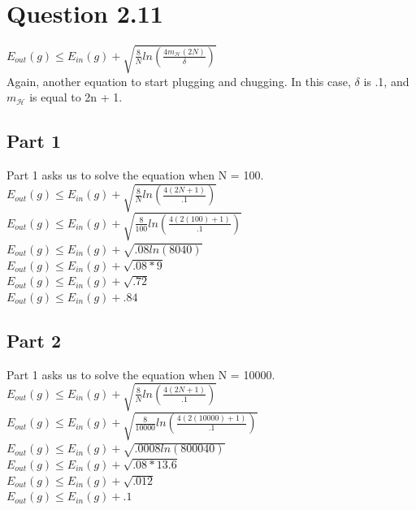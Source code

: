 \documentclass[a4paper]{article}
\begin{document}
\section{Question 2.11}
$E_{out}(g)\leq E_{in}(g)+\sqrt{\frac{8}{N}ln(\frac{4m_\mathcal{H}(2N)}{\delta})}$\\
Again, another equation to start plugging and chugging. In this case, $\delta$ is .1, and $m_\mathcal{H}$ is equal to 2n + 1.
\subsection{Part 1}
Part 1 asks us to solve the equation when N = 100.
$E_{out}(g)\leq E_{in}(g)+\sqrt{\frac{8}{N}ln(\frac{4(2N+1)}{.1})}$\\
$E_{out}(g)\leq E_{in}(g)+\sqrt{\frac{8}{100}ln(\frac{4(2(100)+1)}{.1})}$\\
$E_{out}(g)\leq E_{in}(g)+\sqrt{.08ln(8040)}$\\
$E_{out}(g)\leq E_{in}(g)+\sqrt{.08*9}$\\
$E_{out}(g)\leq E_{in}(g)+\sqrt{.72}$\\
$E_{out}(g)\leq E_{in}(g)+.84$
\subsection{Part 2}
Part 1 asks us to solve the equation when N = 10000.
$E_{out}(g)\leq E_{in}(g)+\sqrt{\frac{8}{N}ln(\frac{4(2N+1)}{.1})}$\\
$E_{out}(g)\leq E_{in}(g)+\sqrt{\frac{8}{10000}ln(\frac{4(2(10000)+1)}{.1})}$\\
$E_{out}(g)\leq E_{in}(g)+\sqrt{.0008ln(800040)}$\\
$E_{out}(g)\leq E_{in}(g)+\sqrt{.08*13.6}$\\
$E_{out}(g)\leq E_{in}(g)+\sqrt{.012}$\\
$E_{out}(g)\leq E_{in}(g)+.1$\\
\end{document}
